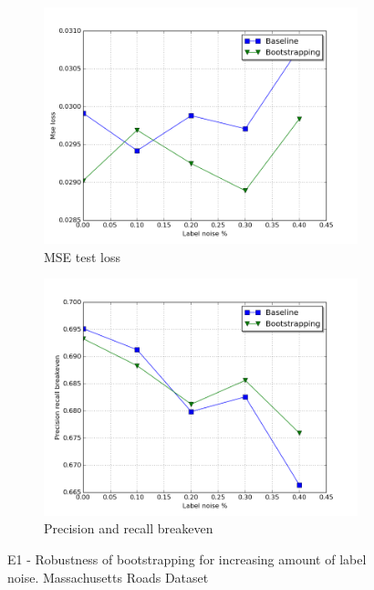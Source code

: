 \begin{figure}
\begin{subfigure}{0.48\textwidth}
\includegraphics[width=\linewidth]{figs/E1/E1_lc_noise.png}
\caption{MSE test loss} \label{fig:E1_boot_mass_loss}
\end{subfigure}
\hspace*{\fill} %
\begin{subfigure}{0.48\textwidth}
\includegraphics[width=\linewidth]{figs/E1/E1_pr_noise.png}
\caption{Precision and recall breakeven} \label{fig:E1_boot_mass_pr}
\end{subfigure}
\hspace*{\fill} %
\caption[E1 - Robustness of bootstrapping with  Massachusetts Roads Dataset]{E1 - Robustness of bootstrapping for increasing amount of label noise. Massachusetts Roads Dataset} \label{fig:E1_boot_mass}
\end{figure}

